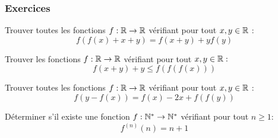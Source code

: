 \subsubsection{Exercices}
\begin{exo} %
Trouver toutes les fonctions $f:\mathbb R\rightarrow \mathbb R$ vérifiant pour tout $x,y\in \mathbb R$ :
$$f(f(x)+x+y) = f(x+y) + y f(y)$$
\end{exo}


\begin{exo}
Trouver les fonctions $f:\mathbb R\rightarrow \mathbb R$ vérifiant pour tout $x,y\in \mathbb R:$
$$f(x+y)+y\le f(f(f(x)))$$
\end{exo}


\begin{exo} %
Trouver toutes les fonctions $f:\mathbb R\rightarrow \mathbb R$ vérifiant pour tout $x,y\in \mathbb R$ :
$$f(y-f(x))=f(x)-2x+f(f(y))$$
\end{exo}




\begin{exo}
Déterminer s'il existe une fonction $f: \mathbb N^* \rightarrow \mathbb N^*$ vérifiant pour tout $n\ge 1$: $$f^{(n)}(n)=n+1$$
\end{exo}


